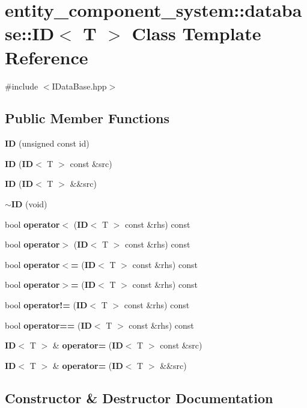 \section{entity\+\_\+component\+\_\+system\+:\+:database\+:\+:ID$<$ T $>$ Class Template Reference}
\label{classentity__component__system_1_1database_1_1_i_d}


{\ttfamily \#include $<$I\+Data\+Base.\+hpp$>$}

\subsection*{Public Member Functions}
\begin{DoxyCompactItemize}
\item 
{\bf ID} (unsigned const id)
\item 
{\bf ID} ({\bf ID}$<$ T $>$ const \&src)
\item 
{\bf ID} ({\bf ID}$<$ T $>$ \&\&src)
\item 
{\bf $\sim$\+ID} (void)
\item 
bool {\bf operator$<$} ({\bf ID}$<$ T $>$ const \&rhs) const
\item 
bool {\bf operator$>$} ({\bf ID}$<$ T $>$ const \&rhs) const
\item 
bool {\bf operator$<$=} ({\bf ID}$<$ T $>$ const \&rhs) const
\item 
bool {\bf operator$>$=} ({\bf ID}$<$ T $>$ const \&rhs) const
\item 
bool {\bf operator!=} ({\bf ID}$<$ T $>$ const \&rhs) const
\item 
bool {\bf operator==} ({\bf ID}$<$ T $>$ const \&rhs) const
\item 
{\bf ID}$<$ T $>$ \& {\bf operator=} ({\bf ID}$<$ T $>$ const \&src)
\item 
{\bf ID}$<$ T $>$ \& {\bf operator=} ({\bf ID}$<$ T $>$ \&\&src)
\end{DoxyCompactItemize}


\subsection{Constructor \& Destructor Documentation}
\label{classentity__component__system_1_1database_1_1_i_d_a3c6b323ed778d392cf6e9840f431310a} 
